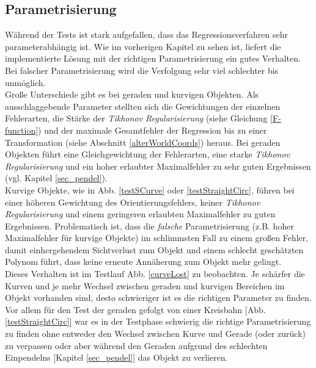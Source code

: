 \subsection{Parametrisierung}
\label{sec_param}
Während der Tests ist stark aufgefallen, dass das Regressionsverfahren sehr parameterabhängig ist. Wie im vorherigen Kapitel zu sehen ist, liefert die implementierte Lösung mit der richtigen Parametrisierung ein gutes Verhalten. 
Bei falscher Parametrisierung wird die Verfolgung sehr viel schlechter bis unmöglich.\\
Große Unterschiede gibt es bei geraden und kurvigen Objekten. Als ausschlaggebende Parameter stellten sich die Gewichtungen der einzelnen Fehlerarten, die Stärke der \textit{Tikhonov Regularisierung} (siehe Gleichung \ref{F-function}) und der maximale Gesamtfehler der Regression bis zu einer Transformation (siehe Abschnitt \ref{alterWorldCoords}) heraus.
Bei geraden Objekten führt eine Gleichgewichtung der Fehlerarten, eine starke \textit{Tikhonov Regularisierung} und ein hoher erlaubter Maximalfehler zu sehr guten Ergebnissen (vgl. Kapitel \ref{sec_pendel}).\\
Kurvige Objekte, wie in Abb. \ref{testSCurve} oder \ref{testStraightCirc}, führen bei einer höheren Gewichtung des Orientierungsfehlers, keiner \textit{Tikhonov Regularisierung} und einem geringeren erlaubten Maximalfehler zu guten Ergebnissen.
Problematisch ist, dass die \textit{falsche} Parametrisierung (z.B. hoher Maximalfehler für kurvige Objekte) im schlimmsten Fall zu einem großen Fehler, damit einhergehendem Sichtverlust zum Objekt und einem schlecht geschätzten Polynom führt, dass keine erneute Annäherung zum Objekt mehr gelingt. \\
Dieses Verhalten ist im Testlauf Abb. \ref{curveLost} zu beobachten. Je schärfer die Kurven und je mehr Wechsel zwischen geraden und kurvigen Bereichen im Objekt vorhanden sind, desto schwieriger ist es die richtigen Parameter zu finden. Vor allem für den Test der geraden gefolgt von einer Kreisbahn [Abb. \ref{testStraightCirc}] war es in der Testphase schwierig die richtige Parametrisierung zu finden ohne entweder den Wechsel zwischen Kurve und Gerade (oder zurück) zu verpassen oder aber während den Geraden aufgrund des schlechten Einpendelns [Kapitel \ref{sec_pendel}] das Objekt zu verlieren.

